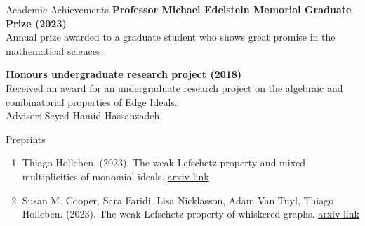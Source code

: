 \documentclass{resume} %
\begin{document}


\begin{rSection}{Academic Achievements}
{\bf Professor Michael Edelstein Memorial Graduate Prize (2023)}
\\
Annual prize awarded to a graduate student who shows great promise in the mathematical sciences. 


{\bf Honours undergraduate research project (2018)}
\\
Received an award for an undergraduate research project on the algebraic and combinatorial properties of Edge Ideals.
\\
Advisor: Seyed Hamid Hassanzadeh
\end{rSection}

\begin{rSection}{Preprints}

\begin{enumerate}[label={}]
    \item Thiago Holleben. (2023). The weak Lefschetz property and mixed multiplicities of monomial ideals.  \href{https://arxiv.org/abs/2306.13274}{arxiv link}
    \item Susan M. Cooper, Sara Faridi, Lisa Nicklasson, Adam Van Tuyl, Thiago Holleben. (2023). The weak Lefschetz property of whiskered graphs. \href{https://arxiv.org/abs/2306.04393}{arxiv link}
\end{enumerate}
\end{rSection}
\end{document}
